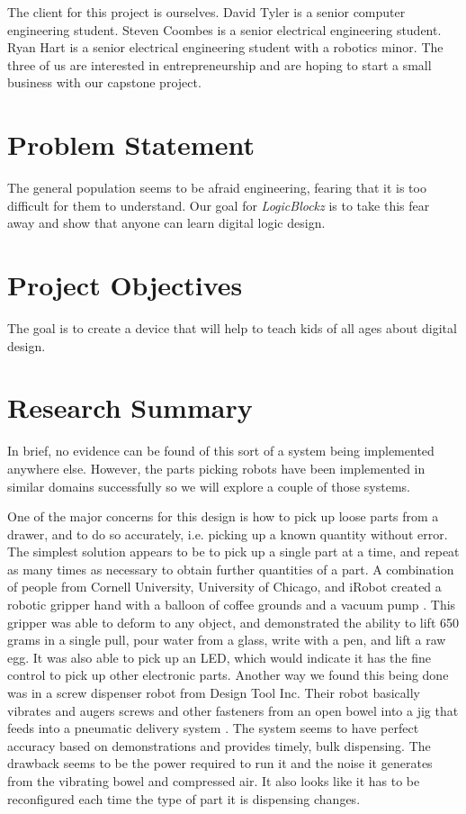 \documentclass[12pt]{report}
\begin{document}
The client for this project is ourselves. David Tyler is a senior computer engineering student. Steven Coombes is a senior electrical engineering student. Ryan Hart is a senior electrical engineering student with a robotics minor. The three of us are interested in entrepreneurship and are hoping to start a small business with our capstone project. 

\section*{Problem Statement}

The general population seems to be afraid engineering, fearing that it is too difficult for them to understand. Our goal for \textit{LogicBlockz} is to take this fear away and show that anyone can learn digital logic design. 

\section*{Project Objectives}

The goal is to create a device that will help to teach kids of all ages about digital design.

\section*{Research Summary}
In brief, no evidence can be found of this sort of a system being implemented anywhere else. However, the parts picking robots have been implemented in similar domains successfully so we will explore a couple of those systems. 
	
	
One of the major concerns for this design is how to pick up loose parts from a drawer, and to do so accurately, i.e. picking up a known quantity without error.  The simplest solution appears to be to pick up a single part at a time, and repeat as many times as necessary to obtain further quantities of a part.  A combination of people from Cornell University, University of Chicago, and iRobot created a robotic gripper hand with a balloon of coffee grounds and a vacuum pump \cite{universalGrabber}.  This gripper was able to deform to any object, and demonstrated the ability to lift 650 grams in a single pull, pour water from a glass, write with a pen, and lift a raw egg.  It was also able to pick up an LED, which would indicate it has the fine control to pick up other electronic parts.  Another way we found this being done was in a screw dispenser robot from Design Tool Inc. Their robot basically vibrates and augers screws and other fasteners from an open bowel into a jig that feeds into a pneumatic delivery system \cite{screwDispenser}. The system seems to have perfect accuracy based on demonstrations and provides timely, bulk dispensing. The drawback seems to be the power required to run it and the noise it generates from the vibrating bowel and compressed air. It also looks like it has to be reconfigured each time the type of part it is dispensing changes.
\end{document}
